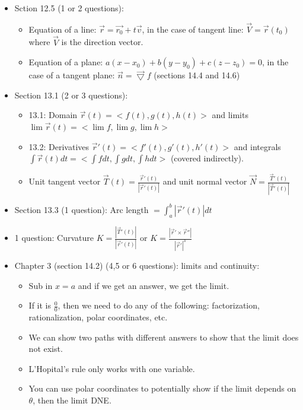 \documentclass{article}
\newcommand{\tri}{\vec{\bigtriangledown}}
\newcommand{\Int}[2]{\int_{#1}^{#2}}
\begin{document}
\begin{itemize}
    \itemsep 0em
    \item Sction 12.5 (1 or 2 questions): \begin{itemize}
        \itemsep 0em
        \item Equation of a line: $\vec{r}=\vec{r_0}+t\vec{v}$, in the case of tangent line: $\vec{V}=\vec{r}(t_0)$ where $\vec{V}$ is the direction vector.
        \item Equation of a plane: $a(x-x_0)+b(y-y_0)+c(z-z_0)=0$, in the case of a tangent plane: $\vec{n}=\tri f$ (sections 14.4 and 14.6)
    \end{itemize}
    \item Section 13.1 (2 or 3 questions): \begin{itemize}
        \itemsep 0em
        \item 13.1: Domain $\vec{r}(t)=<f(t),g(t),h(t)>$ and limits $\lim \vec{r}(t)=<\lim f,\lim g,\lim h>$
        \item 13.2: Derivatives $\vec{r}'(t)=<f'(t),g'(t),h'(t)>$ and integrals $\int\vec{r}(t)dt=<\int fdt,\int gdt,\int hdt>$ (covered indirectly).
        \item Unit tangent vector $\vec{T}(t)=\frac{\vec{r}'(t)}{|\vec{r}'(t)|}$ and unit normal vector $\vec{N}=\frac{\vec{T}'(t)}{|\vec{T}'(t)|}$
    \end{itemize}
    \item Section 13.3 (1 question): Arc length $=\Int{a}{b}|\vec{r}'(t)|dt$
    \item 1 question: Curvature $K=\frac{|\vec{T}'(t)|}{|\vec{r}'(t)|}$ or $K=\frac{|\vec{r}'\times\vec{r}''|}{|\vec{r}'|^3}$
    \item Chapter 3 (section 14.2) (4,5 or 6 questions): limits and continuity: \begin{itemize}
        \itemsep 0em
        \item Sub in $x=a$ and if we get an answer, we get the limit.
        \item If it is $\frac{0}{0}$, then we need to do any of the following: factorization, rationalization, polar coordinates, etc.
        \item We can show two paths with different answers to show that the limit does not exist.
        \item L'Hopital's rule only works with one variable.
        \item You can use polar coordinates to potentially show if the limit depends on $\theta$, then the limit DNE.
    \end{itemize}

\end{itemize}
\end{document}
